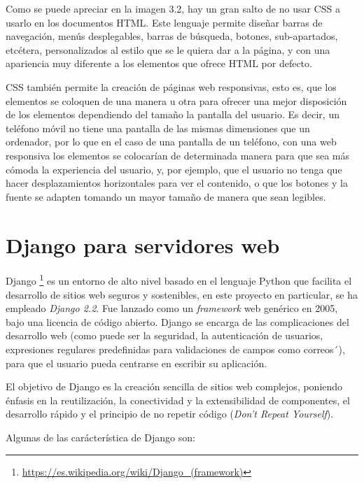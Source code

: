 \documentclass[a4paper, 12pt]{book}
\begin{document}
Como se puede apreciar en la imagen 3.2, hay un gran salto de no usar CSS a usarlo en los documentos HTML. Este lenguaje permite diseñar barras de navegación, menús desplegables, barras de búsqueda, botones, sub-apartados, etcétera, personalizados al estilo que se le quiera dar a la página, y con una apariencia muy diferente a los elementos que ofrece HTML por defecto.

CSS también permite la creación de páginas web responsivas, esto es, que los elementos se coloquen de una manera u otra para ofrecer una mejor disposición de los elementos dependiendo del tamaño la pantalla del usuario. Es decir, un teléfono móvil no tiene una pantalla de las mismas dimensiones que un ordenador, por lo que en el caso de una pantalla de un teléfono, con una web responsiva los elementos se colocarían de determinada manera para que sea más cómoda la experiencia del usuario, y, por ejemplo, que el usuario no tenga que hacer desplazamientos horizontales para ver el contenido, o que los botones y la fuente se adapten tomando un mayor tamaño de manera que sean legibles.

\section{Django para servidores web}
\label{sec:django}

Django \footnote{\url{https://es.wikipedia.org/wiki/Django_(framework)}} \cite{django} es un entorno de alto nivel basado en el lenguaje Python que facilita el desarrollo de sitios web seguros y sostenibles, en este proyecto en particular, se ha empleado \emph{Django 2.2}. Fue lanzado como un \emph{framework} web genérico en 2005, bajo una licencia de código abierto. Django se encarga de las complicaciones del desarrollo web (como puede ser la seguridad, la autenticación de usuarios, expresiones regulares predefinidas para validaciones de campos como correos´), para que el usuario pueda centrarse en escribir su aplicación.

El objetivo de Django es la creación sencilla de sitios web complejos, poniendo énfasis en la reutilización, la conectividad y la extensibilidad de componentes, el desarrollo rápido y el principio de no repetir código (\textit{Don't Repeat Yourself}).

Algunas de las carácterística de Django son:
\end{document}

